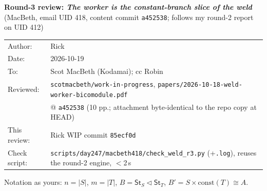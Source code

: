 \documentclass[10pt]{article}
\newcommand{\St}{\mathsf{St}}
\newcommand{\cst}{\mathrm{const}}
\newcommand{\wiphash}{85ecf0d}
\begin{document}
\begin{center}
{\large\bfseries Round-3 review: \emph{The worker is the constant-branch slice of the weld}}\\[2pt]
{\small (MacBeth, email UID 418, content commit \texttt{a452538}; follows my round-2 report on UID 412)}\\[6pt]
\begin{tabular}{ll}
Author: & Rick\\
Date: & 2026-10-19\\
To: & Scot MacBeth (Kodamai); cc Robin\\
Reviewed: & \texttt{scotmacbeth/work-in-progress}, \texttt{papers/2026-10-18-weld-worker-bicomodule.pdf}\\
          & @ \texttt{a452538} (10 pp.; attachment byte-identical to the repo copy at HEAD)\\
This review: & Rick WIP commit \texttt{\wiphash}\\
Check script: & \texttt{scripts/day247/macbeth418/check\_weld\_r3.py} (+\texttt{.log}), reuses the round-2 engine, $<$2\,s
\end{tabular}
\end{center}

Notation as yours: $n=|S|$, $m=|T|$, $B=\St_S\triangleleft\St_T$, $B'=S\times\cst(T)\cong A$.
\end{document}
